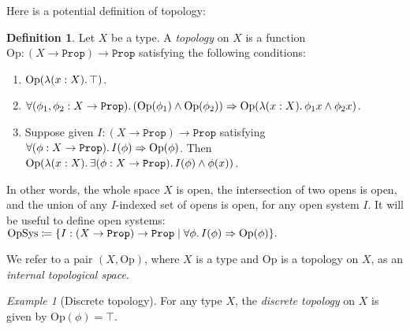 \documentclass[11pt, oneside, article]{memoir}
\theoremstyle{plain}
\theoremstyle{definition}
\newtheorem{definition}[theorem]{Definition}
\theoremstyle{remark}
\newtheorem{example}[theorem]{Example}
\newcommand{\const}[1]{\mathtt{#1}}
\newcommand{\Set}[1]{\mathrm{#1}}
\newcommand{\Prop}{\const{Prop}}
\newcommand{\Op}{\Set{Op}}
\newcommand{\imp}{\Rightarrow}
\begin{document}

Here is a potential definition of topology:
\begin{definition}
Let $X$ be a type. A \emph{topology} on $X$ is a function $\Op:(X\to\Prop)\to\Prop$ satisfying the following conditions:
\begin{enumerate}
	\item $\Op(\lambda(x:X)\ldotp\top)$.
	\item $\forall(\phi_1,\phi_2:X\to\Prop)\ldotp(\Op(\phi_1)\wedge\Op(\phi_2))\imp\Op(\lambda(x:X)\ldotp\phi_1 x\wedge\phi_2 x)$.
	\item Suppose given $I:(X\to\Prop)\to\Prop$ satisfying $\forall(\phi:X\to\Prop)\ldotp I(\phi)\imp\Op(\phi)$. Then $\Op(\lambda(x:X)\ldotp\exists(\phi:X\to\Prop)\ldotp I(\phi)\wedge\phi (x))$.
\end{enumerate}
In other words, the whole space $X$ is open, the intersection of two opens is open, and the union of any $I$-indexed set of opens is open, for any open system $I$. It will be useful to define open systems: $\mathrm{OpSys}\coloneqq\{I:(X\to\Prop)\to\Prop\mid\forall \phi\ldotp I(\phi)\imp\Op(\phi)\}.$

We refer to a pair $(X,\Op)$, where $X$ is a type and $\Op$ is a topology on $X$, as an \emph{internal topological space}.
\end{definition}

\begin{example}[Discrete topology]
For any type $X$, the \emph{discrete topology} on $X$ is given by $\Op(\phi)=\top$.
\end{example}
\end{document}
